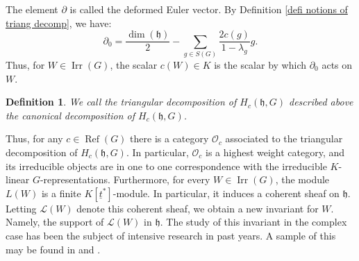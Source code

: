 \documentclass{amsart}
\newtheorem{defi}{ Definition}[subsection]
\newcommand{\OX}{\mathcal{O}}
\begin{document}
The element $\partial$ is called the deformed Euler vector. By Definition \ref{defi notions of triang decomp}, we have:
\begin{equation*}
    \partial_0 = \frac{\operatorname{dim}(\mathfrak{h})}{2}- \sum_{g\in S(G)}\frac{2c(g)}{1-\lambda_g}g.
\end{equation*}
Thus, for $W\in\operatorname{Irr}(G)$, the scalar $c(W)\in K$ is the scalar by which $\partial_0$ acts on $W$. 
\begin{defi}
We call the triangular decomposition of $H_c(\mathfrak{h},G)$ described above the canonical decomposition of $H_c(\mathfrak{h},G)$.
\end{defi}
Thus, for any $c\in\operatorname{Ref}(G)$ there is a category $\OX_c$ associated to the triangular decomposition of $H_c(\mathfrak{h},G)$. In particular, $\OX_c$ is a highest weight category, and its irreducible objects are in one to one correspondence with the irreducible $K$-linear $G$-representations. Furthermore, for every $W\in \operatorname{Irr}(G)$, the module $L(W)$
is a finite $K[\underline{t}^*]$-module. In particular, it induces a coherent sheaf on $\mathfrak{h}$. Letting $\mathcal{L}(W)$ denote this coherent sheaf, we obtain a new invariant for $W$. Namely, the support of $\mathcal{L}(W)$ in $\mathfrak{h}$. The study of this invariant in the complex case has been the subject of intensive research in past years. A sample of this may be found in \cite{bezrukavnikov2009parabolic} and \cite{primitive ideals}.
\end{document}
